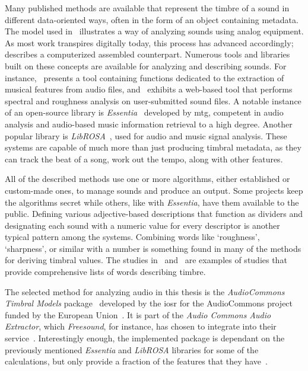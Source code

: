 Many published methods are available that represent the timbre of a sound in different data-oriented ways, often in the form of an object containing metadata. The model used in~\cite{unpub:the_timbral_model} illustrates a way of analyzing sounds using analog equipment. As most work transpires digitally today, this process has advanced accordingly;~\cite{rep:constructing_high-level_perceptual_audio_descriptors_for_textural_sounds} describes a computerized assembled counterpart. Numerous tools and libraries built on these concepts are available for analyzing and describing sounds. For instance,~\cite{rep:mirtoolbox} presents a tool containing functions dedicated to the extraction of musical features from audio files, and~\cite{rep:sra} exhibits a web-based tool that performs spectral and roughness analysis on user-submitted sound files. A notable instance of an open-source library is \emph{Essentia}~\cite{essentia, rep:essentia} developed by \gls{mtg}, competent in audio analysis and audio-based music information retrieval to a high degree. Another popular library is \emph{LibROSA}~\cite{librosa, rep:librosa}, used for audio and music signal analysis. These systems are capable of much more than just producing timbral metadata, as they can track the beat of a song, work out the tempo, along with other features.

All of the described methods use one or more algorithms, either established or custom-made ones, to manage sounds and produce an output. Some projects keep the algorithms secret while others, like with \emph{Essentia}, have them available to the public. Defining various adjective-based descriptions that function as dividers and designating each sound with a numeric value for every descriptor is another typical pattern among the systems. Combining words like `roughness', `sharpness', or similar with a number is something found in many of the methods for deriving timbral values. The studies in~\cite{rep:words_that_describe_timbre_a_study_of_auditory_perception_through_language} and~\cite[20]{rep:d5.1} are examples of studies that provide comprehensive lists of words describing timbre.

The selected method for analyzing audio in this thesis is the \emph{AudioCommons Timbral Models} package~\cite{timbral_models} developed by the \gls{iosr} for the AudioCommons project funded by the European Union~\cite{audiocommons}. It is part of the \emph{Audio Commons Audio Extractor}, which \emph{Freesound}, for instance, has chosen to integrate into their service~\cite{ac-audio-extractor, freesound:integration}. Interestingly enough, the implemented package is dependant on the previously mentioned \emph{Essentia} and \emph{LibROSA} libraries for some of the calculations, but only provide a fraction of the features that they have~\cite[4]{rep:d5.2}\cite[5]{rep:d5.6}.

